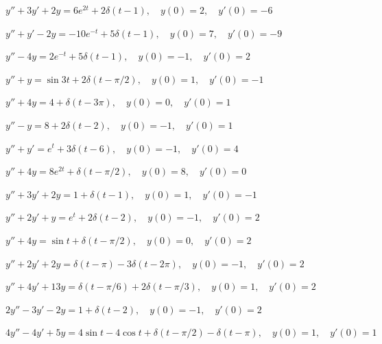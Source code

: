 \begin{exerciselist}
  \item\label{exer:8.7.1} $y''+3y'+2y=6e^{2t}+2\delta(t-1),\quad y(0)=2,\quad y'(0)=-6$

  \item\label{exer:8.7.2} \CGex $y''+y'-2y=-10e^{-t}+5\delta(t-1),\quad y(0)=7,\quad y'(0)=-9$

  \item\label{exer:8.7.3} $y''-4y=2e^{-t}+5\delta(t-1),\quad y(0)=-1,\quad y'(0)=2$

  \item\label{exer:8.7.4} \CGex $y''+y=\sin3t+2\delta(t-\pi/2),\quad y(0)=1,\quad y'(0)=-1$

  \item\label{exer:8.7.5} $y''+4y=4+\delta(t-3\pi),\quad y(0)=0,\quad y'(0)=1$

  \item\label{exer:8.7.6} $y''-y=8+2\delta(t-2),\quad y(0)=-1,\quad y'(0)=1$

  \item\label{exer:8.7.7} $y''+y'=e^{t}+3\delta(t-6),\quad y(0)=-1,\quad y'(0)=4$

  \item\label{exer:8.7.8} $y''+4y=8e^{2t}+\delta(t-\pi/2),\quad y(0)=8,\quad y'(0)=0$

  \item\label{exer:8.7.9} \CGex $y''+3y'+2y=1+\delta(t-1),\quad y(0)=1,\quad y'(0)=-1$

  \item\label{exer:8.7.10} $y''+2y'+y=e^{t}+2\delta(t-2),\quad y(0)=-1,\quad y'(0)=2$

  \item\label{exer:8.7.11} \CGex $y''+4y=\sin t+\delta(t-\pi/2),\quad y(0)=0,\quad y'(0)=2$

  \item\label{exer:8.7.12} $y''+2y'+2y=\delta(t-\pi)-3\delta(t-2\pi),\quad y(0)=-1,\quad y'(0)=2$

  \item\label{exer:8.7.13} $y''+4y'+13y=\delta(t-\pi/6)+2\delta(t-\pi/3),\quad y(0)=1,\quad y'(0)=2$

  \item\label{exer:8.7.14} $2y''-3y'-2y=1+\delta(t-2),\quad y(0)=-1,\quad y'(0)=2$

  \item\label{exer:8.7.15}
        $4y''-4y'+5y=4\sin t-4\cos t+\delta(t-\pi/2)-\delta(t-\pi),\quad y(0)=1,\quad y'(0)=1$


\end{exerciselist}

